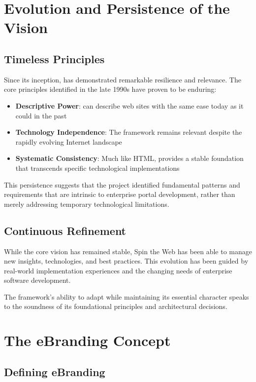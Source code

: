 \section{Evolution and Persistence of the Vision}

\subsection{Timeless Principles}

Since its inception, \wbdl{} has demonstrated remarkable resilience and relevance. The core principles identified in the late 1990s have proven to be enduring:

\begin{itemize}
\item \textbf{Descriptive Power}: \wbdl{} can describe web sites with the same ease today as it could in the past
\item \textbf{Technology Independence}: The framework remains relevant despite the rapidly evolving Internet landscape
\item \textbf{Systematic Consistency}: Much like HTML, \wbdl{} provides a stable foundation that transcends specific technological implementations
\end{itemize}

This persistence suggests that the project identified fundamental patterns and requirements that are intrinsic to enterprise portal development, rather than merely addressing temporary technological limitations.

\subsection{Continuous Refinement}

While the core vision has remained stable, Spin the Web has been able to manage new insights, technologies, and best practices. This evolution has been guided by real-world implementation experiences and the changing needs of enterprise software development.

The framework's ability to adapt while maintaining its essential character speaks to the soundness of its foundational principles and architectural decisions.

\section{The eBranding Concept}

\subsection{Defining eBranding}

